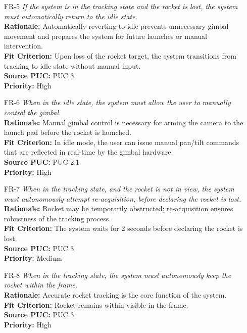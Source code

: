 \documentclass[12pt]{article}
\begin{document}
\begin{itemize}[leftmargin=*]
  \item[FR-5] \emph{If the system is in the tracking state and the rocket is lost, the
          system must automatically return to the idle state.}\\[2mm]
        \textbf{Rationale:} Automatically reverting to idle prevents unnecessary gimbal movement and prepares the system for future launches or manual intervention.\\
        \textbf{Fit Criterion:} Upon loss of the rocket target, the system transitions from tracking to idle state without manual input.\\
        \textbf{Source PUC:} PUC 3 \\
        \textbf{Priority:} High

  \item[FR-6] \emph{When in the idle state, the system must allow the user to manually
          control the gimbal.}\\[2mm]
        \textbf{Rationale:} Manual gimbal control is necessary for arming the camera to the launch pad before the rocket is launched.\\
        \textbf{Fit Criterion:} In idle mode, the user can issue manual pan/tilt commands that are reflected in real-time by the gimbal hardware.\\
        \textbf{Source PUC:} PUC 2.1 \\
        \textbf{Priority:} High

  \item[FR-7] \emph{When in the tracking state, and the rocket is not in view, the
          system must autonomously attempt re-acquisition, before declaring the rocket is
          lost.}\\[2mm]
        \textbf{Rationale:} Rocket may be temporarily obstructed; re-acquisition ensures robustness of the tracking process.\\
        \textbf{Fit Criterion:} The system waits for 2 seconds before declaring the rocket is lost.\\
        \textbf{Source PUC:} PUC 3 \\
        \textbf{Priority:} Medium

  \item[FR-8] \emph{When in the tracking state, the system must autonomously keep the
          rocket within the frame.}\\[2mm]
        \textbf{Rationale:} Accurate rocket tracking is the core function of the system.\\
        \textbf{Fit Criterion:} Rocket remains within visible in the frame.\\
        \textbf{Source PUC:} PUC 3 \\
        \textbf{Priority:} High


\end{itemize}
\end{document}
